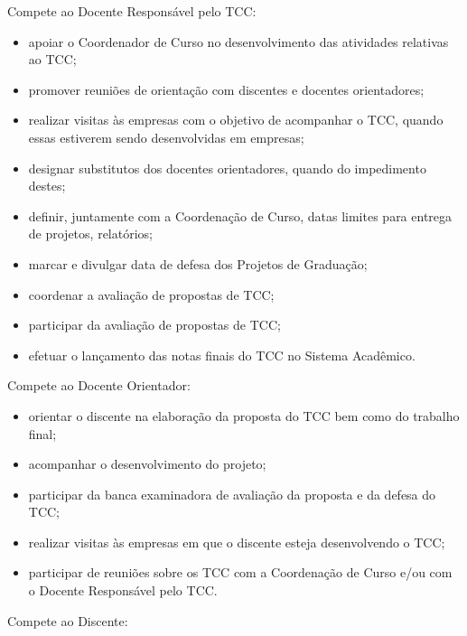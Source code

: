 Compete ao Docente Responsável pelo TCC: 
\begin{itemize}
	\item apoiar o Coordenador de Curso no desenvolvimento das atividades relativas ao TCC; 
	\item promover reuniões de orientação com discentes e docentes orientadores; 
	\item realizar visitas às empresas com o objetivo de acompanhar o TCC, quando essas estiverem sendo desenvolvidas em empresas;
	\item designar substitutos dos docentes orientadores, quando do impedimento destes; 
	\item definir, juntamente com a Coordenação de Curso, datas limites para entrega de projetos, relatórios; 
	\item marcar e divulgar data de defesa dos Projetos de Graduação; 
	\item coordenar a avaliação de propostas de TCC; 
	\item participar da avaliação de propostas de TCC; 
	\item efetuar o lançamento das notas finais do TCC no Sistema Acadêmico. 
\end{itemize}

Compete ao Docente Orientador: 
\begin{itemize}
	\item orientar o discente na elaboração da proposta do TCC bem como do trabalho final; 

	\item acompanhar o desenvolvimento do projeto;

	\item participar da banca examinadora de avaliação da proposta e da defesa do TCC; 

	\item realizar visitas às empresas em que o discente esteja desenvolvendo o TCC; 

	\item participar de reuniões sobre os TCC com a Coordenação de Curso e/ou com o Docente Responsável pelo TCC. 
\end{itemize}

Compete ao Discente: 

